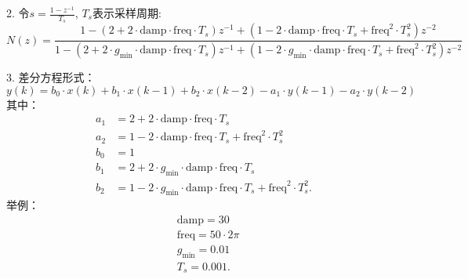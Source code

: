             2. 令$s = \frac{1-z^{-1}}{T_s}$, $T_s$表示采样周期: 
                \begin{equation}
                    N(z) = \frac{1 - \left(2 + 2 \cdot \text{damp} \cdot \text{freq} \cdot T_s\right)z^{-1} + \left(1 - 2 \cdot \text{damp} \cdot \text{freq} \cdot T_s + \text{freq}^2 \cdot T_s^2\right)z^{-2}}{1 - \left(2 + 2 \cdot g_{\text{min}} \cdot \text{damp} \cdot \text{freq} \cdot T_s\right)z^{-1} + \left(1 - 2 \cdot g_{\text{min}} \cdot \text{damp} \cdot \text{freq} \cdot T_s + \text{freq}^2 \cdot T_s^2\right)z^{-2}}
                \end{equation}

            3. 差分方程形式：
            \begin{equation}
                y(k) = b_0 \cdot x(k) + b_1 \cdot x(k-1) + b_2 \cdot x(k-2) - a_1 \cdot y(k-1) - a_2 \cdot y(k-2)
            \end{equation}
            其中：
                \begin{equation}
                    \begin{aligned}
                        a_1 &= 2 + 2 \cdot \text{damp} \cdot \text{freq} \cdot T_s \\
                        a_2 &= 1 - 2 \cdot \text{damp} \cdot \text{freq} \cdot T_s + \text{freq}^2 \cdot T_s^2 \\
                        b_0 &= 1 \\
                        b_1 &= 2 + 2 \cdot g_{\text{min}} \cdot \text{damp} \cdot \text{freq} \cdot T_s \\
                        b_2 &= 1 - 2 \cdot g_{\text{min}} \cdot \text{damp} \cdot \text{freq} \cdot T_s + \text{freq}^2 \cdot T_s^2.
                        \end{aligned}
                \end{equation}
            举例：
            \begin{equation}
                \begin{aligned}
                    &\text{damp} = 30 \\
                    &\text{freq} = 50 \cdot  2\pi \\
                    &g_{\text{min}} =  0.01\\
                    &T_s = 0.001.
                    \end{aligned}
            \end{equation}
        
